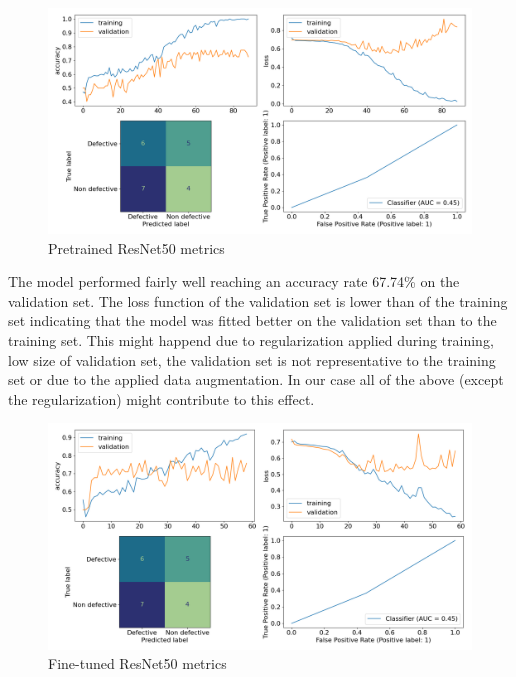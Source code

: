 \documentclass[10pt, final]{article}
\begin{document}
\begin{figure}[!ht]
	\centering
	\includegraphics[width=\textwidth]{./tex_graphs/metrics_ResNet50_pretrained.png}
	\caption{Pretrained ResNet50 metrics}
	\label{fig:ResNet50_pretrained_metrics}
\end{figure}

The model performed fairly well reaching an accuracy rate 67.74\% on the validation set.
The loss function of the validation set is lower than of the training set indicating that the model was fitted
better on the validation set than to the training set.
This might happend due to regularization applied during training, low size of validation set, the validation set
is not representative to the training set or due to the applied data augmentation.
In our case all of the above (except the regularization) might contribute to this effect.

\begin{figure}[!ht]
	\centering
	\includegraphics[width=\textwidth]{./tex_graphs/metrics_ResNet50_pretrained_finetuned.png}
	\caption{Fine-tuned ResNet50 metrics}
	\label{fig:ResNet50_finetuned_metrics}
\end{figure}
\end{document}
